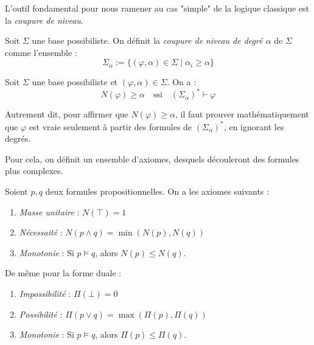 L'outil fondamental pour nous ramener au cas "simple" de la logique classique est la \emph{coupure de 
niveau}. 

\begin{definition}
    Soit $ \Sigma$ une base possibiliste. On définit la \emph{coupure de niveau de degré $ \alpha$}
    de $ \Sigma$ comme l'ensemble : 
        \begin{equation}
            \displaystyle \Sigma_\alpha := \{ ( \varphi, \alpha) \in \Sigma \mid \alpha_i \geqslant \alpha\}
        \end{equation}
\end{definition}

\begin{theorem}[Fondamental]
    Soit $ \Sigma$ une base possibiliste et $ ( \varphi, \alpha) \in \Sigma$. On a : 
        \begin{equation}
            N( \varphi) \geqslant \alpha \quad \text{ssi} \quad ( \Sigma_\alpha)^* \vdash \varphi 
        \end{equation}
\end{theorem}

Autrement dit, pour affirmer que $ N( \varphi) \geqslant \alpha$, il faut prouver 
mathématiquement que $ \varphi$ est vraie seulement à partir des formules de $ (\Sigma_\alpha)^*$, 
en ignorant les degrés. 

Pour cela, on définit un ensemble d'axiomes, desquels découleront des formules plus complexes. 

\begin{definition}
    Soient $ p,q$ deux formules propositionnelles. On a les axiomes suivants : 
    \begin{enumerate}[label=\roman*)]
        \item \emph{Masse unitaire} : $N(\top) = 1$ 
        \item \emph{Nécessaité} : $N( p \wedge q) = \min( N(p), N(q)) $
        \item \emph{Monotonie} : Si $ p \models q$, alors $ N(p) \leqslant N(q)$. 
    \end{enumerate}
    De même pour la forme duale : 
    \begin{enumerate}[label=\roman*)]
        \item \emph{Impossibilité} : $ \Pi( \bot ) = 0$ 
        \item \emph{Possibilité} : $ \Pi( p \vee q) = \max( \Pi(p), \Pi(q))$ 
        \item \emph{Monotonie} : Si $ p \models q$, alors $ \Pi(p) \leqslant \Pi(q)$. 
    \end{enumerate}
\end{definition}

